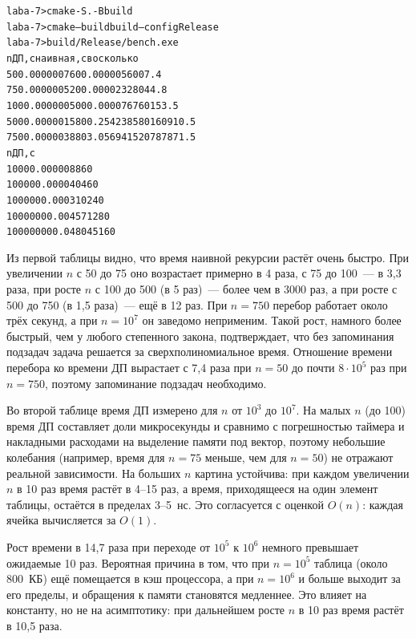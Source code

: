 \begin{alltt}
laba-7>cmake -S . -B build
laba-7>cmake --build build --config Release
laba-7>build/Release/bench.exe
n       ДП, с           наивная, с   во сколько
50      0.000000760     0.000005600  7.4
75      0.000000520     0.000023280  44.8
100     0.000000500     0.000076760  153.5
500     0.000001580     0.254238580  160910.5
750     0.000003880     3.056941520  787871.5
n       ДП, с
1000    0.000008860
10000   0.000040460
100000  0.000310240
1000000 0.004571280
10000000 0.048045160
\end{alltt}

Из первой таблицы видно, что время наивной рекурсии растёт очень быстро. При увеличении $n$ с 50 до 75 оно возрастает примерно в 4 раза,
с 75 до 100~--- в 3{,}3 раза, при росте $n$ с 100 до 500 (в 5 раз)~--- более чем в 3000 раз, а при росте с 500 до 750
(в 1{,}5 раза)~--- ещё в 12 раз. При $n = 750$ перебор работает около трёх секунд, а при $n = 10^7$ он заведомо неприменим.
Такой рост, намного более быстрый, чем у любого степенного закона, подтверждает, что без запоминания подзадач задача решается за
сверхполиномиальное время. Отношение времени перебора ко времени ДП вырастает с 7{,}4 раза при $n = 50$ до почти $8 \cdot 10^5$ раз
при $n = 750$, поэтому запоминание подзадач необходимо.

Во второй таблице время ДП измерено для $n$ от $10^3$ до $10^7$. На малых $n$ (до 100) время ДП составляет доли микросекунды и
сравнимо с погрешностью таймера и накладными расходами на выделение памяти под вектор, поэтому небольшие колебания
(например, время для $n = 75$ меньше, чем для $n = 50$) не отражают реальной зависимости. На больших $n$ картина устойчива: при каждом
увеличении $n$ в 10 раз время растёт в 4--15 раз, а время, приходящееся на один элемент таблицы, остаётся в пределах 3--5~нс.
Это согласуется с оценкой $O(n)$: каждая ячейка вычисляется за $O(1)$.

Рост времени в 14{,}7 раза при переходе от $10^5$ к $10^6$ немного превышает ожидаемые 10 раз. Вероятная причина в том,
что при $n = 10^5$ таблица (около 800~КБ) ещё помещается в кэш процессора, а при $n = 10^6$ и больше выходит за
его пределы, и обращения к памяти становятся медленнее. Это влияет на константу, но не на асимптотику: при дальнейшем
росте $n$ в 10 раз время растёт в 10{,}5 раза.

\pagebreak